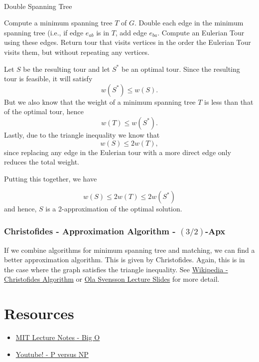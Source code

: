\begin{algorithm}
\\
\caption{Double Spanning Tree}\label{alg:double-spanning-tree}
\begin{algorithmic}[1]
	\State Compute a minimum spanning tree $T$ of $G$.
 	\State Double each edge in the minimum spanning tree (i.e., if edge $e_{ab}$ is in $T$, add edge $e_{ba}$. 
	\State Compute an Eulerian Tour  using these edges.
	\State Return tour that visits vertices in the order the Eulerian Tour visits them, but without repeating any vertices.
	\end{algorithmic}
\end{algorithm}

Let $S$ be the resulting tour and let $S^*$ be an optimal tour.
Since the resulting tour is feasible, it will satisfy 
\[
w(S^*) \leq w(S).
\]
But we also know that the weight of a minimum spanning tree $T$ is less than that of the optimal tour, hence
\[
w(T) \leq w(S^*).
\]
Lastly, due to the triangle inequality we know that 
\[
w(S) \leq 2 w(T),
\]
since replacing any edge in the Eulerian tour with a more direct edge only reduces the total weight.

Putting this together, we have

\[w(S) \leq 2w(T) \leq 2 w(S^*)\]
and hence, $S$ is a 2-approximation of the optimal solution.


\subsubsection{Christofides - Approximation Algorithm - $(3/2)$-Apx}
If we combine algorithms for minimum spanning tree and matching, we can find a better approximation algorithm.  This is given by Christofides.  Again, this is in the case where the graph satisfies the triangle inequality.  See 
\href{https://en.wikipedia.org/wiki/Christofides_algorithm}{Wikipedia - Christofides Algorithm} or \href{https://resources.mpi-inf.mpg.de/conferences/adfocs-15/material/Ola-Lect1.pdf}{Ola Svensson Lecture Slides} for more detail.


\section{Resources}
\begin{resource}
\begin{itemize}
\item \href{http://web.mit.edu/16.070/www/lecture/big_o.pdf}{MIT Lecture Notes - Big O}
\item \href{https://www.youtube.com/watch?v=YX40hbAHx3s}{Youtube! - P versus NP}
\end{itemize}
\end{resource}


